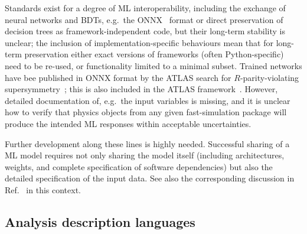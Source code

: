 \documentclass[11pt]{article}
\begin{document}
Standards exist for a degree of \gls{ML} interoperability, including the exchange of neural networks and \glspl{BDT}, e.g.~the 
\gls{ONNX}~\cite{onnx} format or direct preservation of decision trees as framework-independent code, but their long-term stability is unclear; the inclusion of implementation-specific behaviours mean that for long-term preservation either exact versions of frameworks (often Python-specific) need to be re-used, or functionality limited to a minimal subset. Trained networks have bee published in \gls{ONNX} format by the \gls{ATLAS} search for $R$-parity-violating supersymmetry~\cite{ATLAS:2021fbt,hepdata.104860.v1/r3}; this is also included in the \gls{ATLAS} \simpleanalysis framework~\cite{atlas:simpleanalysis}. 
However, detailed documentation of, e.g.~the input variables is missing, and it is unclear how to verify that physics objects from any given fast-simulation package will produce the intended \gls{ML} responses within acceptable uncertainties.

Further development along these lines is highly needed. Successful sharing of a \gls{ML} model requires not only sharing the model itself (including architectures, weights, and complete specification of software dependencies) but also the detailed specification of the input data. See also the corresponding discussion in Ref.~\cite{snowmass:MLevts} in this context.







\subsection{Analysis description languages}
\end{document}
